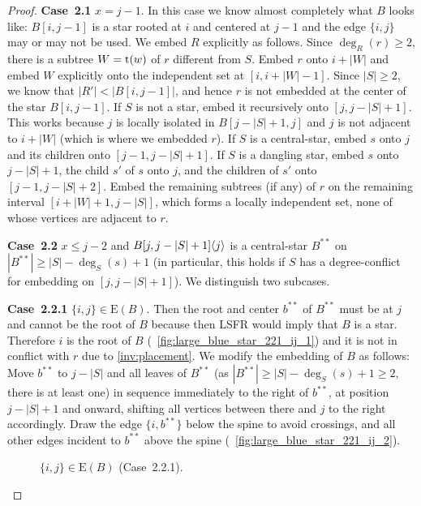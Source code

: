 \documentclass[11pt,a4paper,colorlinks=true,urlcolor=blue,citecolor=red]{article}
\theoremstyle{plain}
\newcommand{\case}[1]{\par\vspace{.5\baselineskip}\noindent\textbf{\sffamily Case~#1}}
\newcommand{\EB}{\mathrm{E}(B)}
\begin{document}
\begin{proof}
  \case{2.1} $x=j-1$. In this case we know almost completely what $B$
  looks like: $B[i,j-1]$ is a star rooted at $i$ and centered at $j-1$
  and the edge $\{i,j\}$ may or may not be used. We embed $R$ explicitly
  as follows. Since $\deg_R(r)\geq2$, there is a subtree $W=\mathrm t(w)$ of
  $r$ different from $S$. Embed $r$ onto $i+|W|$ and embed $W$
  explicitly onto the independent set at $[i,i+|W|-1]$. Since
  $|S|\geq2$, we know that $|R'|<|B[i,j-1]|$, and hence $r$ is not
  embedded at the center of the star $B[i,j-1]$. If $S$ is not a star,
  embed it recursively onto $[j,j-|S|+1]$. This works because $j$ is
  locally isolated in $B[j-|S|+1,j]$ and $j$ is not adjacent to $i+|W|$
  (which is where we embedded $r$). If $S$ is a central-star, embed $s$
  onto $j$ and its children onto $[j-1,j-|S|+1]$. If $S$ is a dangling
  star, embed $s$ onto $j-|S|+1$, the child $s'$ of $s$ onto $j$, and
  the children of $s'$ onto $[j-1,j-|S|+2]$. Embed the remaining
  subtrees (if any) of $r$ on the remaining interval $[i+|W|+1,j-|S|]$,
  which forms a locally independent set, none of whose vertices are
  adjacent to $r$.

  \case{2.2} $x\le j-2$ and $B{[j,j-|S|+1]}\langle{j}\rangle$ is a central-star
  $B^{**}$ on $|B^{**}|\ge|S|-\deg_S(s)+1$ (in particular, this holds if
  $S$ has a degree-conflict for embedding on $[j,j-|S|+1]$). We
  distinguish two subcases.

  \case{2.2.1} $\{i,j\}\in\EB$. Then the root and center $b^{**}$ of
  $B^{**}$ must be at $j$ and cannot be the root of $B$ because then
  LSFR would imply that $B$ is a star. Therefore $i$ is the root of $B$
  (\figurename~\ref{fig:large_blue_star_221_ij_1}) and it is not in
  conflict with $r$ due to \ref{inv:placement}. We modify the embedding
  of $B$ as follows: Move $b^{**}$ to $j-|S|$ and all leaves of $B^{**}$ (as
  $|B^{**}|\ge|S|-\deg_S(s)+1\ge 2$, there is at least one) in sequence
  immediately to the right of $b^{**}$, at position $j-|S|+1$ and onward,
  shifting all vertices between there and $j$ to the right accordingly.
  Draw the edge $\{i,b^{**}\}$ below the spine to avoid crossings, and all
  other edges incident to $b^{**}$ above the spine
  (\figurename~\ref{fig:large_blue_star_221_ij_2}).
\begin{figure}[htbp]
    \centering\hfil {}\hfil
    \hfil
    \caption{$\{i,j\}\in\EB$
      (Case~2.2.1).\label{fig:large_blue_star_221_ij}}
  \end{figure}



\end{proof}
\end{document}
